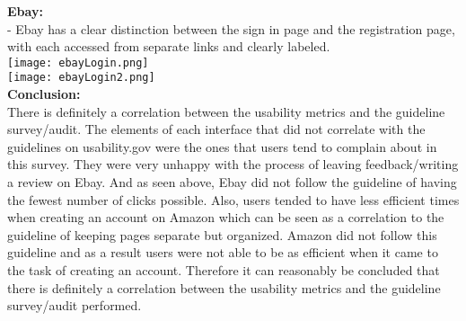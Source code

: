 \documentclass{article}
\begin{document}
\textbf{Ebay:}\\
  - Ebay has a clear distinction between the sign in page and the registration page, with each accessed from separate links and clearly labeled.\\
\texttt{[image: ebayLogin.png]}\\
\texttt{[image: ebayLogin2.png]}\\	 
\textbf{Conclusion:}\\ 
\indent There is definitely a correlation between the usability metrics and the guideline survey/audit. The elements of each interface that did not correlate with the guidelines on usability.gov were the ones that users tend to complain about in this survey. They were very unhappy with the process of leaving feedback/writing a review on Ebay. And as seen above, Ebay did not follow the guideline of having the fewest number of clicks possible. Also, users tended to have less efficient times when creating an account on Amazon which can be seen as a correlation to the guideline of keeping pages separate but organized. Amazon did not follow this guideline and as a result users were not able to be as efficient when it came to the task of creating an account. Therefore it can reasonably be concluded that there is definitely a correlation between the usability metrics and the guideline survey/audit performed.
\end{document}
